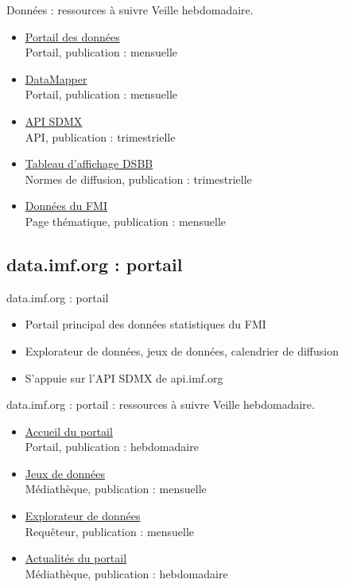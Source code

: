 \documentclass[aspectratio=169,11pt]{beamer}
\begin{document}
\begin{frame}{Données : ressources à suivre}
\small
Veille hebdomadaire.
\begin{itemize}
\item \href{https://data.imf.org}{Portail des données}\\{\footnotesize Portail, publication : mensuelle}
\item \href{https://www.imf.org/external/datamapper}{DataMapper}\\{\footnotesize Portail, publication : mensuelle}
\item \href{https://api.imf.org/external/sdmx/2.1/dataflow}{API SDMX}\\{\footnotesize API, publication : trimestrielle}
\item \href{https://dsbb.imf.org}{Tableau d'affichage DSBB}\\{\footnotesize Normes de diffusion, publication : trimestrielle}
\item \href{https://www.imf.org/en/Data}{Données du FMI}\\{\footnotesize Page thématique, publication : mensuelle}
\end{itemize}
\end{frame}

\subsection{data.imf.org : portail}
\begin{frame}{data.imf.org : portail}
\begin{itemize}
\item Portail principal des données statistiques du FMI
\item Explorateur de données, jeux de données, calendrier de diffusion
\item S'appuie sur l'API SDMX de api.imf.org
\end{itemize}
\end{frame}

\begin{frame}{data.imf.org : portail : ressources à suivre}
\small
Veille hebdomadaire.
\begin{itemize}
\item \href{https://data.imf.org}{Accueil du portail}\\{\footnotesize Portail, publication : hebdomadaire}
\item \href{https://data.imf.org/en/Datasets}{Jeux de données}\\{\footnotesize Médiathèque, publication : mensuelle}
\item \href{https://data.imf.org/en/Data-Explorer}{Explorateur de données}\\{\footnotesize Requêteur, publication : mensuelle}
\item \href{https://data.imf.org/en/news}{Actualités du portail}\\{\footnotesize Médiathèque, publication : hebdomadaire}
\end{itemize}
\end{frame}
\end{document}
